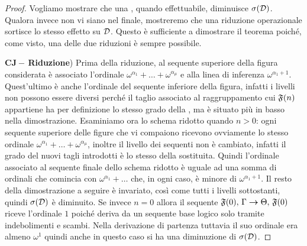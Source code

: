 	\begin{proof}
		Vogliamo mostrare che una , quando effettuabile, diminuisce $\sigma(\mathcal{D})$. Qualora invece non vi siano  nel finale, mostreremo che una riduzione operazionale sortisce lo stesso effetto su $\mathcal{D}$. Questo è sufficiente a dimostrare il teorema poiché, come visto, una delle due riduzioni è sempre possibile.
		
		$\bm{CJ-}\,$\textbf{Riduzione}) Prima della riduzione, al sequente superiore della figura considerata è associato l'ordinale $\omega^{\alpha_1} + \ldots + \omega^{\alpha_{\mu}}$ e alla linea di inferenza $\omega^{\alpha_1+1}$. Quest'ultimo è anche l'ordinale del sequente inferiore della figura, infatti i livelli non possono essere diversi perché il taglio associato al raggruppamento cui $\mathfrak{F}(n)$ appartiene ha per definizione lo stesso grado della , ma è situato più in basso nella dimostrazione. Esaminiamo ora lo schema ridotto quando $n>0$: ogni sequente superiore delle figure che vi compaiono ricevono ovviamente lo stesso ordinale $\omega^{\alpha_1} + \ldots + \omega^{\alpha_{\mu}}$, inoltre il livello dei sequenti non è cambiato, infatti il grado del nuovi tagli introdotti è lo stesso della  sostituita. Quindi l'ordinale associato al sequente finale dello schema ridotto è uguale ad una somma di ordinali che comincia con $\omega^{\alpha_1} + \ldots$ che, in ogni caso, è minore di $\omega^{\alpha_1+1}$. Il resto della dimostrazione a seguire è invariato, così come tutti i livelli sottostanti, quindi $\sigma(\mathcal{D})$ è diminuito. Se invece $n=0$ allora il sequente $\mathfrak{F}(0),\, \Gamma \bm{\rightarrow} \Theta,\, \mathfrak{F}(0)$ riceve l'ordinale $1$ poiché deriva da un sequente base logico solo tramite indebolimenti e scambi. Nella derivazione di partenza tuttavia il suo ordinale era almeno $\omega^1$ quindi anche in questo caso si ha una diminuzione di $\sigma(\mathcal{D})$.
		

\end{proof}
